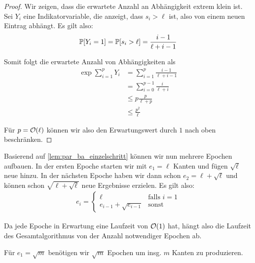 \begin{proof}
    Wir zeigen, dass die erwartete Anzahl an Abhängigkeit extrem klein ist.
    Sei $Y_i$ eine Indikatorvariable, die anzeigt, dass $s_i > \ell$ ist, also von einem neuen Eintrag abhängt.
    Es gilt also:
    \begin{align}
        \mathbb{P}\!\left[Y_i = 1\right] = \mathbb{P}\!\left[s_i > \ell\right] = \frac{i - 1}{\ell + i - 1}
    \end{align}

    \noindent
    Somit folgt die erwartete Anzahl von Abhängigkeiten als
    \begin{align}
        \exp{\sum_{i=1}^p Y_i} & = \sum_{i=1}^{p} \frac{i - 1}{\ell + i - 1} \\
                               & = \sum_{i=0}^{p-1} \frac{i}{\ell + i}       \\
                               & \le p \frac{p}{\ell + p}                    \\
                               & \le \frac{p^2}{\ell}
    \end{align}

    \noindent
    Für $p = \mathcal{O}\!\left(\ell\right)$ können wir also den Erwartungswert durch $1$ nach oben beschränken.
\end{proof}

Basierend auf \cref{lem:par_ba_einzelschritt} können wir nun mehrere Epochen aufbauen.
In der ersten Epoche starten wir mit $e_1 = \ell$ Kanten und fügen $\sqrt{\ell}$ neue hinzu.
In der nächsten Epoche haben wir dann schon $e_2 = \ell + \sqrt{\ell}$ und können schon $\sqrt{\ell + \sqrt{\ell}}$ neue Ergebnisse erzielen.
Es gilt also:
\begin{align}
    e_i = \begin{cases}
        \ell                     & \text{falls } i = 1 \\
        e_{i-1} + \sqrt{e_{i-1}} & \text{sonst}
    \end{cases}
\end{align}

Da jede Epoche in Erwartung eine Laufzeit von $\mathcal{O}\!\left(1\right)$ hat, hängt also die Laufzeit des Gesamtalgorithmus von der Anzahl notwendiger Epochen ab.

\begin{lemma}
    Für $e_1 = \sqrt{m}$ benötigen wir $\sqrt{m}$ Epochen um insg. $m$ Kanten zu produzieren.
\end{lemma}

